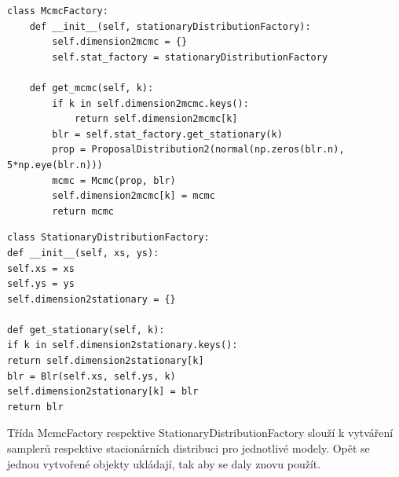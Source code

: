 \documentclass[czech,master,public,dept470,male,cpdeclaration,oneside, python]{diploma}
\begin{document}
\begin{lstlisting}[caption=McmcFactory]
class McmcFactory:
    def __init__(self, stationaryDistributionFactory):
        self.dimension2mcmc = {}
        self.stat_factory = stationaryDistributionFactory

    def get_mcmc(self, k):
        if k in self.dimension2mcmc.keys():
            return self.dimension2mcmc[k]
        blr = self.stat_factory.get_stationary(k)
        prop = ProposalDistribution2(normal(np.zeros(blr.n), 5*np.eye(blr.n)))
        mcmc = Mcmc(prop, blr)
        self.dimension2mcmc[k] = mcmc
        return mcmc
\end{lstlisting}
\begin{lstlisting}[caption=StationaryDistributionFactory]
class StationaryDistributionFactory:
def __init__(self, xs, ys):
self.xs = xs
self.ys = ys
self.dimension2stationary = {}

def get_stationary(self, k):
if k in self.dimension2stationary.keys():
return self.dimension2stationary[k]
blr = Blr(self.xs, self.ys, k)
self.dimension2stationary[k] = blr
return blr
\end{lstlisting}

Třída McmcFactory respektive StationaryDistributionFactory  slouží k vytváření samplerů respektive stacionárních distribuci pro jednotlivé modely. Opět se jednou vytvořené objekty ukládají, tak aby se daly znovu použít. 
\end{document}
